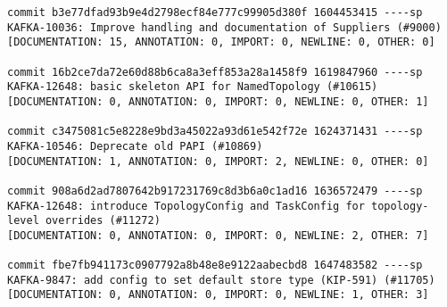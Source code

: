 \begin{lstlisting}
commit b3e77dfad93b9e4d2798ecf84e777c99905d380f 1604453415 ----sp 
KAFKA-10036: Improve handling and documentation of Suppliers (#9000)                                 
[DOCUMENTATION: 15, ANNOTATION: 0, IMPORT: 0, NEWLINE: 0, OTHER: 0]

commit 16b2ce7da72e60d88b6ca8a3eff853a28a1458f9 1619847960 ----sp 
KAFKA-12648: basic skeleton API for NamedTopology (#10615)                                           
[DOCUMENTATION: 0, ANNOTATION: 0, IMPORT: 0, NEWLINE: 0, OTHER: 1]

commit c3475081c5e8228e9bd3a45022a93d61e542f72e 1624371431 ----sp 
KAFKA-10546: Deprecate old PAPI (#10869)                                                             
[DOCUMENTATION: 1, ANNOTATION: 0, IMPORT: 2, NEWLINE: 0, OTHER: 0]

commit 908a6d2ad7807642b917231769c8d3b6a0c1ad16 1636572479 ----sp 
KAFKA-12648: introduce TopologyConfig and TaskConfig for topology-level overrides (#11272)
[DOCUMENTATION: 0, ANNOTATION: 0, IMPORT: 0, NEWLINE: 2, OTHER: 7]

commit fbe7fb941173c0907792a8b48e8e9122aabecbd8 1647483582 ----sp 
KAFKA-9847: add config to set default store type (KIP-591) (#11705)                                  
[DOCUMENTATION: 0, ANNOTATION: 0, IMPORT: 0, NEWLINE: 1, OTHER: 3]
\end{lstlisting}

\subsection{}
\label{sec:StreamsBuilder-Diff-Metadata}

